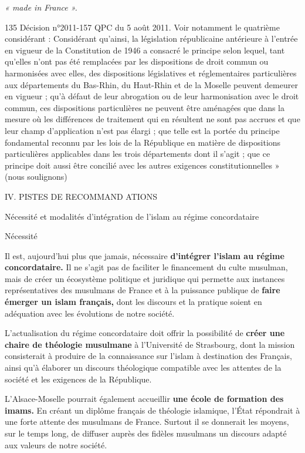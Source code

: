 \emph{« made in France ».}

135 Décision n°2011-157 QPC du 5 août 2011. Voir notamment le quatrième
considérant : Considérant qu'ainsi, la législation républicaine
antérieure à l'entrée en vigueur de la Constitution de 1946 a consacré
le principe selon lequel, tant qu'elles n'ont pas été remplacées par les
dispositions de droit commun ou harmonisées avec elles, des dispositions
législatives et réglementaires particulières aux départements du
Bas-Rhin, du Haut-Rhin et de la Moselle peuvent demeurer en vigueur ;
qu'à défaut de leur abrogation ou de leur harmonisation avec le droit
commun, ces dispositions particulières ne peuvent être aménagées que
dans la mesure où les différences de traitement qui en résultent ne sont
pas accrues et que leur champ d'application n'est pas élargi ; que telle
est la portée du principe fondamental reconnu par les lois de la
République en matière de dispositions particulières applicables dans les
trois départements dont il s'agit ; que ce principe doit aussi être
concilié avec les autres exigences constitutionnelles » (nous
soulignons)

IV. PISTES DE RECOMMAND ATIONS


Nécessité et modalités d'intégration de l'islam au régime concordataire

Nécessité


Il est, aujourd'hui plus que jamais, nécessaire \textbf{d'intégrer
l'islam au régime concordataire.} Il ne s'agit pas de faciliter le
financement du culte musulman, mais de créer un écosystème politique et
juridique qui permette aux instances représentatives des musulmans de
France et à la puissance publique de \textbf{faire émerger un islam
français,} dont les discours et la pratique soient en adéquation avec
les évolutions de notre société.

L'actualisation du régime concordataire doit offrir la possibilité de
\textbf{créer une chaire de théologie musulmane} à l'Université de
Strasbourg, dont la mission consisterait à produire de la connaissance
sur l'islam à destination des Français, ainsi qu'à élaborer un discours
théologique compatible avec les attentes de la société et les exigences
de la République.

L'Alsace-Moselle pourrait également accueillir \textbf{une école de
formation des imams.} En créant un diplôme français de théologie
islamique, l'État répondrait à une forte attente des musulmans de
France. Surtout il se donnerait les moyens, sur le temps long, de
diffuser auprès des fidèles musulmans un discours adapté aux valeurs de
notre société.


